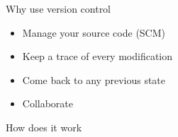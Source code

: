 \begin{frame}
\begin{center}{\large Why use version control}\end{center}

  \begin{itemize}
    \item Manage your source code (SCM)
    \item Keep a trace of every modification
    \item Come back to any previous state
    \item Collaborate
  \end{itemize}

\end{frame}

\begin{frame}
\begin{center}{\large How does it work}\end{center}
\end{frame}

